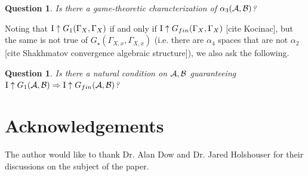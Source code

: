 \documentclass{amsart}
\theoremstyle{plain}
\newtheorem{question}[theorem]{Question}
\theoremstyle{definition}
\theoremstyle{remark}
\theoremstyle{plain}
\theoremstyle{definition}
\theoremstyle{remark}
\begin{document}
\begin{question}
Is there a game-theoretic characterization of \(\alpha_3(\mathcal{A},\mathcal{B})\)?
\end{question}

Noting that \(\mathrm{I}\uparrow G_1(\Gamma_X,\Gamma_X)\) if and only if
\(\mathrm{I}\uparrow G_{fin}(\Gamma_X,\Gamma_X)\) [cite Kocinac], but
the same is not true of \(G_\star(\Gamma_{X,x},\Gamma_{X,x})\)
(i.e. there are \(\alpha_4\) spaces that are not \(\alpha_2\)
[cite Shakhmatov convergence algebraic structure]),
we also ask the following.

\begin{question}
Is there a natural condition on \(\mathcal{A},\mathcal{B}\) guaranteeing
\(\mathrm{I}\uparrow G_1(\mathcal{A},\mathcal{B})\Rightarrow\mathrm{I}\uparrow G_{fin}(\mathcal{A},\mathcal{B})\)?
\end{question}

\section{Acknowledgements}

The author would like to thank Dr. Alan Dow and Dr. Jared Holshouser
for their discussions on the subject of the paper.



\end{document}
